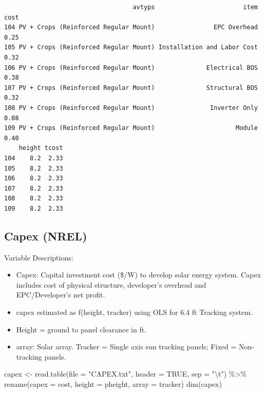 \documentclass[
  letterpaper,
  DIV=11,
  numbers=noendperiod]{scrartcl}
\newenvironment{Shaded}{\begin{snugshade}}{\end{snugshade}}
\newcommand{\AttributeTok}[1]{\textcolor[rgb]{0.40,0.45,0.13}{#1}}
\newcommand{\ConstantTok}[1]{\textcolor[rgb]{0.56,0.35,0.01}{#1}}
\newcommand{\FunctionTok}[1]{\textcolor[rgb]{0.28,0.35,0.67}{#1}}
\newcommand{\NormalTok}[1]{\textcolor[rgb]{0.00,0.23,0.31}{#1}}
\newcommand{\OtherTok}[1]{\textcolor[rgb]{0.00,0.23,0.31}{#1}}
\newcommand{\SpecialCharTok}[1]{\textcolor[rgb]{0.37,0.37,0.37}{#1}}
\newcommand{\StringTok}[1]{\textcolor[rgb]{0.13,0.47,0.30}{#1}}
\begin{document}
\begin{verbatim}
                                   avtyps                        item cost
104 PV + Crops (Reinforced Regular Mount)                EPC Overhead 0.25
105 PV + Crops (Reinforced Regular Mount) Installation and Labor Cost 0.32
106 PV + Crops (Reinforced Regular Mount)              Electrical BOS 0.38
107 PV + Crops (Reinforced Regular Mount)              Structural BOS 0.32
108 PV + Crops (Reinforced Regular Mount)               Inverter Only 0.08
109 PV + Crops (Reinforced Regular Mount)                      Module 0.40
    height tcost
104    8.2  2.33
105    8.2  2.33
106    8.2  2.33
107    8.2  2.33
108    8.2  2.33
109    8.2  2.33
\end{verbatim}

\subsection{Capex (NREL)}\label{capex-nrel}

Variable Descriptions:

\begin{itemize}
\item
  Capex: Capital investment cost (\$/W) to develop solar energy system.
  Capex includes cost of physical structure, developer's overhead and
  EPC/Developer's net profit.
\item
  capex estimated as f(height, tracker) using OLS for 6.4 ft Tracking
  system.
\item
  Height = ground to panel clearance in ft.
\item
  array: Solar array. Tracker = Single axis sun tracking panels; Fixed =
  Non-tracking panels.
\end{itemize}

\begin{Shaded}
\begin{Highlighting}[]
\NormalTok{capex }\OtherTok{\textless{}{-}} \FunctionTok{read.table}\NormalTok{(}\AttributeTok{file =} \StringTok{"CAPEX.txt"}\NormalTok{,}
                    \AttributeTok{header =} \ConstantTok{TRUE}\NormalTok{,}
                  \AttributeTok{sep =} \StringTok{"}\SpecialCharTok{\textbackslash{}t}\StringTok{"}\NormalTok{) }\SpecialCharTok{\%\textgreater{}\%} 
  \FunctionTok{rename}\NormalTok{(}\AttributeTok{capex =}\NormalTok{ cost,}
         \AttributeTok{height =}\NormalTok{ pheight,}
         \AttributeTok{array =}\NormalTok{ tracker)}
\FunctionTok{dim}\NormalTok{(capex)}
\end{Highlighting}
\end{Shaded}
\end{document}
